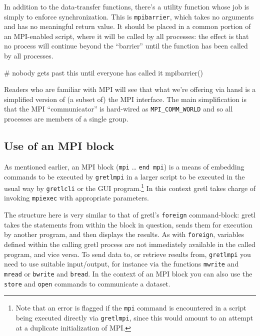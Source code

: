 \documentclass{article}
\begin{document}
In addition to the data-transfer functions, there's a utility function
whose job is simply to enforce synchronization.  This is
\texttt{mpibarrier}, which takes no arguments and has no meaningful
return value. It should be placed in a common portion of an
MPI-enabled script, where it will be called by all processes: the
effect is that no process will continue beyond the ``barrier'' until
the function has been called by all processes.
\begin{code}
# nobody gets past this until everyone has called it
mpibarrier()
\end{code}

\vspace{1ex}

Readers who are familiar with MPI will see that what we're offering
via hansl is a simplified version of (a subset of) the MPI
interface. The main simplification is that the MPI ``communicator'' is
hard-wired as \verb|MPI_COMM_WORLD| and so all processes are members
of a single group.

\subsection{Use of an MPI block}
\label{subsec:mpi-block}

As mentioned earlier, an MPI block (\texttt{mpi} \dots{} \texttt{end
  mpi}) is a means of embedding commands to be executed by
\texttt{gretlmpi} in a larger script to be executed in the usual
way by \texttt{gretlcli} or the GUI program.\footnote{Note that an
  error is flagged if the \texttt{mpi} command is encountered in a
  script being executed directly via \texttt{gretlmpi}, since this
  would amount to an attempt at a duplicate initialization of MPI.}
In this context gretl takes charge of invoking \texttt{mpiexec} with
appropriate parameters.

The structure here is very similar to that of gretl's \texttt{foreign}
command-block: gretl takes the statements from within the block in
question, sends them for execution by another program, and then
displays the results. As with \texttt{foreign}, variables defined
within the calling gretl process are not immediately available in the
called program, and vice versa. To send data to, or retrieve results
from, \texttt{gretlmpi} you need to use suitable input/output, for
instance via the functions \texttt{mwrite} and \texttt{mread} or
\texttt{bwrite} and \texttt{bread}. In the context of an MPI block you
can also use the \texttt{store} and \texttt{open} commands to
communicate a dataset.
\end{document}
